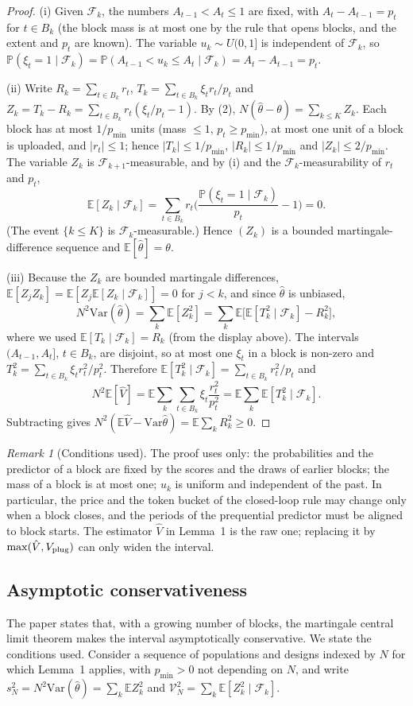 \documentclass[11pt]{article}
\theoremstyle{remark}
\newtheorem{remark}{Remark}
\newcommand{\E}{\mathbb{E}}
\renewcommand{\Pr}{\mathbb{P}}
\newcommand{\Var}{\mathrm{Var}}
\newcommand{\Fk}{\mathcal F}
\newcommand{\hth}{\hat\theta}
\newcommand{\hV}{\hat V}
\begin{document}
\begin{proof}
(i) Given $\Fk_k$, the numbers $A_{t-1}<A_t\le1$ are fixed, with $A_t-A_{t-1}=p_t$ for $t\in B_k$ (the block mass is at most one by the rule that opens blocks, and the extent and $p_t$ are known). The variable $u_k\sim U(0,1]$ is independent of $\Fk_k$, so $\Pr(\xi_t=1\mid\Fk_k)=\Pr(A_{t-1}<u_k\le A_t\mid\Fk_k)=A_t-A_{t-1}=p_t$.

(ii) Write $R_k=\sum_{t\in B_k}r_t$, $T_k=\sum_{t\in B_k}\xi_tr_t/p_t$ and $Z_k=T_k-R_k=\sum_{t\in B_k}r_t(\xi_t/p_t-1)$. By (2), $N(\hth-\theta)=\sum_{k\le K}Z_k$. Each block has at most $1/p_{\min}$ units (mass $\le1$, $p_t\ge p_{\min}$), at most one unit of a block is uploaded, and $|r_t|\le1$; hence $|T_k|\le1/p_{\min}$, $|R_k|\le1/p_{\min}$ and $|Z_k|\le 2/p_{\min}$. The variable $Z_k$ is $\Fk_{k+1}$-measurable, and by (i) and the $\Fk_k$-measurability of $r_t$ and $p_t$,
\[
\E[Z_k\mid\Fk_k]=\sum_{t\in B_k}r_t\Big(\frac{\Pr(\xi_t=1\mid\Fk_k)}{p_t}-1\Big)=0 .
\]
(The event $\{k\le K\}$ is $\Fk_k$-measurable.) Hence $(Z_k)$ is a bounded martingale-difference sequence and $\E[\hth]=\theta$.

(iii) Because the $Z_k$ are bounded martingale differences, $\E[Z_jZ_k]=\E[Z_j\E[Z_k\mid\Fk_k]]=0$ for $j<k$, and since $\hth$ is unbiased,
\[
N^2\Var(\hth)=\sum_k\E[Z_k^2]=\sum_k\E\big[\E[T_k^2\mid\Fk_k]-R_k^2\big],
\]
where we used $\E[T_k\mid\Fk_k]=R_k$ (from the display above). The intervals $(A_{t-1},A_t]$, $t\in B_k$, are disjoint, so at most one $\xi_t$ in a block is non-zero and $T_k^2=\sum_{t\in B_k}\xi_tr_t^2/p_t^2$. Therefore $\E[T_k^2\mid\Fk_k]=\sum_{t\in B_k}r_t^2/p_t$ and
\[
N^2\E[\hV]=\E\sum_k\sum_{t\in B_k}\xi_t\frac{r_t^2}{p_t^2}=\E\sum_k\E[T_k^2\mid\Fk_k].
\]
Subtracting gives $N^2(\E\hV-\Var\hth)=\E\sum_kR_k^2\ge0$.
\end{proof}

\begin{remark}[Conditions used]
The proof uses only: the probabilities and the predictor of a block are fixed by the scores and the draws of earlier blocks; the mass of a block is at most one; $u_k$ is uniform and independent of the past. In particular, the price and the token bucket of the closed-loop rule may change only when a block closes, and the periods of the prequential predictor must be aligned to block starts. The estimator $\hV$ in Lemma~1 is the raw one; replacing it by $\max(\hV,V_{\rm plug})$ can only widen the interval.
\end{remark}

\subsection*{Asymptotic conservativeness}
The paper states that, with a growing number of blocks, the martingale central limit theorem makes the interval asymptotically conservative. We state the conditions used. Consider a sequence of populations and designs indexed by $N$ for which Lemma~1 applies, with $p_{\min}>0$ not depending on $N$, and write $s_N^2=N^2\Var(\hth)=\sum_k\E Z_k^2$ and $\mathcal V_N^2=\sum_k\E[Z_k^2\mid\Fk_k]$.
\end{document}
